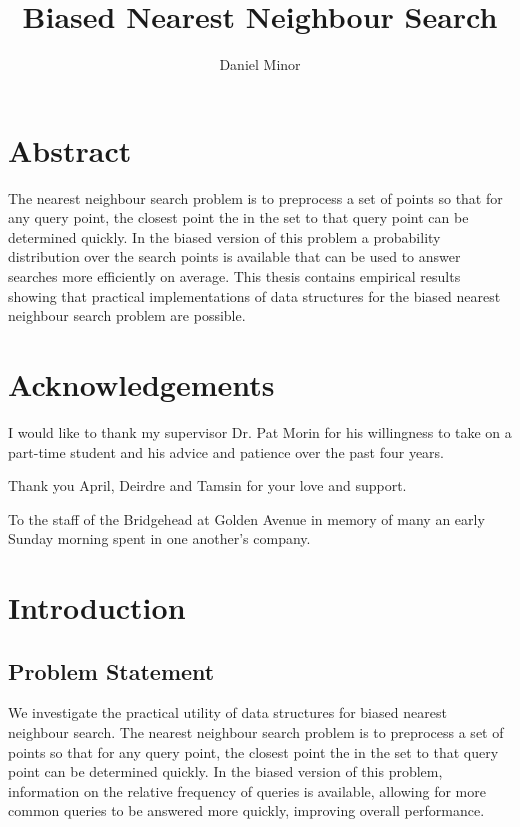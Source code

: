 \documentclass[mcs]{scsthesis}
\title {Biased Nearest Neighbour Search}
\author {Daniel Minor}
\begin{document}
\newtheorem*{thm}{Theorem}

\beforepreface


\chapter*{Abstract}

The nearest neighbour search problem is to preprocess a set of points so that
for any query point, the closest point the in the set to that query point can be
determined quickly. In the biased version of this problem a probability
distribution over the search points is available that can be used to answer
searches more efficiently on average. This thesis contains empirical results
showing that practical implementations of data structures for the biased nearest
neighbour search problem are possible.

\chapter*{Acknowledgements}

I would like to thank my supervisor Dr. Pat Morin for his willingness to take on
a part-time student and his advice and patience over the past four years.

Thank you April, Deirdre and Tamsin for your love and support.

To the staff of the Bridgehead at Golden Avenue in memory of many an early
Sunday morning spent in one another's company.

\afterpreface

\chapter{Introduction}

\section{Problem Statement}

We investigate the practical utility of data structures for biased nearest
neighbour search. The nearest neighbour search problem is to preprocess a set of
points so that for any query point, the closest point the in the set to that
query point can be determined quickly. In the biased version of this problem,
information on the relative frequency of queries is available, allowing for more
common queries to be answered more quickly, improving overall performance.
\end{document}
